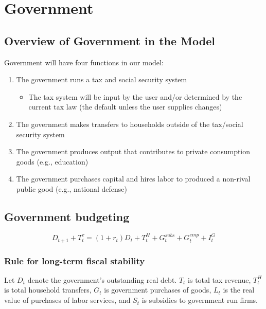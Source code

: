\chapter{Government}
%





\section{Overview of Government in the Model}

Government will have four functions in our model:
\begin{enumerate}
\item The government runs a tax and social security system
	\begin{itemize}
	\item The tax system will be input by the user and/or determined by the current tax law (the default unless the user supplies changes)
	\end{itemize}
\item The government makes transfers to households outside of the tax/social security system
\item The government produces output that contributes to private consumption goods (e.g., education)
\item The government purchases capital and hires labor to produced a non-rival public good (e.g., national defense)
\end{enumerate}


    \section{Government budgeting}
      \begin{equation}
      \label{eqn:gbc}
      D_{t+1} + T^{\tau}_{t} = (1+r_{t})D_{t} + T^{H}_{t} + G^{subs}_{t} + G^{emp}_{t} + I^{G}_{t}
      \end{equation}

    \subsection{Rule for long-term fiscal stability}
      Let $D_t$ denote the government's outstanding real debt.  $T_t$ is total tax revenue, $T^H_t$ is total household transfers, $G_t$ is government purchases of goods, $L_t$ is the real value of purchases of labor services, and $S_t$ is subsidies to government run firms.

